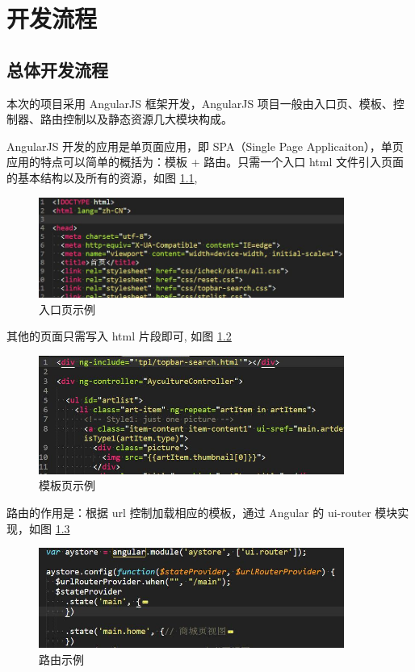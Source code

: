 \documentclass[UTF8]{ctexbook}
\begin{document}
  \chapter{开发流程}
    \label{chap:开发流程}

  \section{总体开发流程}
    \label{sec:总体开发流程}
    本次的项目采用 AngularJS 框架开发，AngularJS 项目一般由入口页、模板、控制器、路由控制以及静态资源几大模块构成。
    \par
    AngularJS 开发的应用是单页面应用，即 SPA（Single Page Applicaiton），单页应用的特点可以简单的概括为：模板 + 路由。只需一个入口 html 文件引入页面的基本结构以及所有的资源，如图 \ref{fig:index},
    \begin{figure}[H]
      \centering
      \includegraphics[width=10cm]{./img/index.jpg}
      \caption{入口页示例}
      \label{fig:index}
    \end{figure}

    其他的页面只需写入 html 片段即可, 如图 \ref{fig:tpl}

    \begin{figure}[H]
      \centering
      \includegraphics[width=10cm]{./img/tpl.jpg}
      \caption{模板页示例}
      \label{fig:tpl}
    \end{figure}

    路由的作用是：根据 url 控制加载相应的模板，通过 Angular 的 ui-router 模块实现，如图 \ref{fig:router}

    \begin{figure}[H]
      \centering
      \includegraphics[width=10cm]{./img/router.jpg}
      \caption{路由示例}
      \label{fig:router}
    \end{figure}
\end{document}
